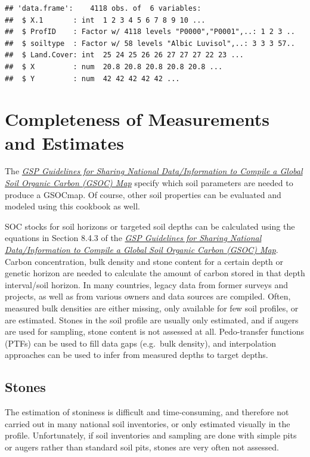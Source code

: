 \documentclass[10pt,b5paper,]{book}
\theoremstyle{definition}
\theoremstyle{definition}
\theoremstyle{definition}
\theoremstyle{remark}
\begin{document}
\begin{verbatim}
## 'data.frame':    4118 obs. of  6 variables:
##  $ X.1       : int  1 2 3 4 5 6 7 8 9 10 ...
##  $ ProfID    : Factor w/ 4118 levels "P0000","P0001",..: 1 2 3 ..
##  $ soiltype  : Factor w/ 58 levels "Albic Luvisol",..: 3 3 3 57..
##  $ Land.Cover: int  25 24 25 26 26 27 27 27 22 23 ...
##  $ X         : num  20.8 20.8 20.8 20.8 20.8 ...
##  $ Y         : num  42 42 42 42 42 ...
\end{verbatim}

\hypertarget{completeness-of-measurements-and-estimates}{%
\section{Completeness of Measurements and
Estimates}\label{completeness-of-measurements-and-estimates}}

The \href{http://www.fao.org/3/a-bp164e.pdf}{\emph{GSP Guidelines for
Sharing National Data/Information to Compile a Global Soil Organic
Carbon (GSOC) Map}} \citep{gsp_guidelines_2017} specify which soil
parameters are needed to produce a GSOCmap. Of course, other soil
properties can be evaluated and modeled using this cookbook as well.

SOC stocks for soil horizons or targeted soil depths can be calculated
using the equations in Section 8.4.3 of the
\href{http://www.fao.org/3/a-bp164e.pdf}{\emph{GSP Guidelines for
Sharing National Data/Information to Compile a Global Soil Organic
Carbon (GSOC) Map}}. Carbon concentration, bulk density and stone
content for a certain depth or genetic horizon are needed to calculate
the amount of carbon stored in that depth interval/soil horizon. In many
countries, legacy data from former surveys and projects, as well as from
various owners and data sources are compiled. Often, measured bulk
densities are either missing, only available for few soil profiles, or
are estimated. Stones in the soil profile are usually only estimated,
and if augers are used for sampling, stone content is not assessed at
all. Pedo-transfer functions (PTFs) can be used to fill data gaps
(e.g.~bulk density), and interpolation approaches can be used to infer
from measured depths to target depths.

\hypertarget{stones}{%
\subsection{Stones}\label{stones}}

The estimation of stoniness is difficult and time-consuming, and
therefore not carried out in many national soil inventories, or only
estimated visually in the profile. Unfortunately, if soil inventories
and sampling are done with simple pits or augers rather than standard
soil pits, stones are very often not assessed.
\end{document}
